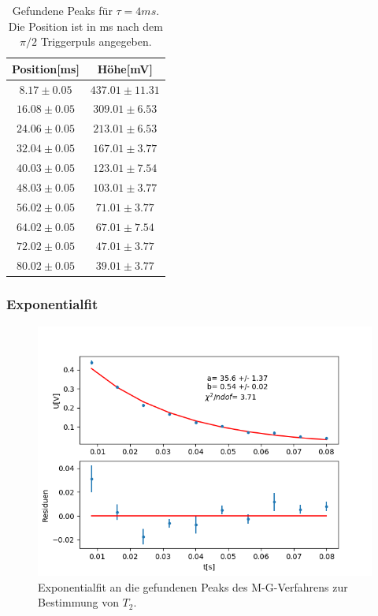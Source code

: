 \documentclass[12pt,a4paper]{article}
\begin{document}
\begin{table}
\centering
\begin{tabular}{|c|c|}
\hline 
Position[ms] & Höhe[mV]\\ 
\hline
$ 8.17 \pm 0.05 $ & $ 437.01 \pm 11.31 $ \\
\hline
$ 16.08 \pm 0.05 $ & $ 309.01 \pm 6.53 $ \\
\hline
$ 24.06 \pm 0.05 $ & $ 213.01 \pm 6.53 $ \\
\hline
$ 32.04 \pm 0.05 $ & $ 167.01 \pm 3.77 $ \\
\hline
$ 40.03 \pm 0.05 $ & $ 123.01 \pm 7.54 $ \\
\hline
$ 48.03 \pm 0.05 $ & $ 103.01 \pm 3.77 $ \\
\hline
$ 56.02 \pm 0.05 $ & $ 71.01 \pm 3.77 $ \\
\hline
$ 64.02 \pm 0.05 $ & $ 67.01 \pm 7.54 $ \\
\hline
$ 72.02 \pm 0.05 $ & $ 47.01 \pm 3.77 $ \\
\hline
$ 80.02 \pm 0.05 $ & $ 39.01 \pm 3.77 $ \\
\hline
\end{tabular}
\caption{Gefundene Peaks für $\tau = 4ms$. Die Position ist in ms nach dem $\pi /2$ Triggerpuls angegeben.}
\label{tab:Peaks}
\end{table}
\newpage
\subsubsection{Exponentialfit}

\begin{figure}
\centering
\includegraphics[scale=0.9]{Bilder/T2exp.png}
\caption{Exponentialfit an die gefundenen Peaks des M-G-Verfahrens zur Bestimmung von $T_2$.}
\label{fig:T2exp}
\end{figure}
\end{document}
